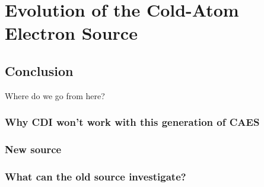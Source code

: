 \part{Evolution of the Cold-Atom Electron Source}












\chapter{Conclusion}

Where do we go from here?

\section{Why CDI won't work with this generation of CAES}

\section{New source}

\section{What can the old source investigate?}


